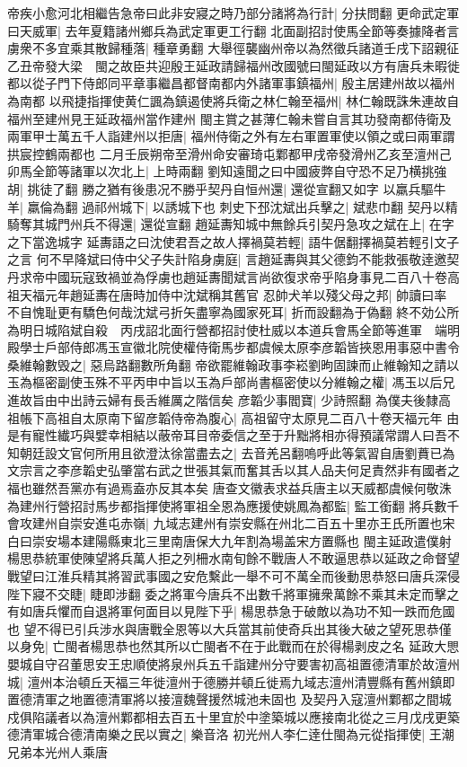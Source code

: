 帝疾小愈河北相繼告急帝曰此非安寢之時乃部分諸將為行計|{
	分扶問翻}
更命武定軍曰天威軍|{
	去年夏籍諸州鄉兵為武定軍更工行翻}
北面副招討使馬全節等奏據降者言虜衆不多宜乘其散歸種落|{
	種章勇翻}
大舉徑襲幽州帝以為然徵兵諸道壬戌下詔親征乙丑帝發大梁　閩之故臣共迎殷王延政請歸福州改國號曰閩延政以方有唐兵未暇徙都以從子門下侍郎同平章事繼昌都督南都内外諸軍事鎮福州|{
	殷主居建州故以福州為南都}
以飛捷指揮使黄仁諷為鎮遏使將兵衛之林仁翰至福州|{
	林仁翰既誅朱連故自福州至建州見王延政福州當作建州}
閩主賞之甚薄仁翰未嘗自言其功發南都侍衛及兩軍甲士萬五千人詣建州以拒唐|{
	福州侍衛之外有左右軍置軍使以領之或曰兩軍謂拱宸控鶴兩都也}
二月壬辰朔帝至滑州命安審琦屯鄴都甲戌帝發滑州乙亥至澶州己卯馬全節等諸軍以次北上|{
	上時兩翻}
劉知遠聞之曰中國疲弊自守恐不足乃横挑強胡|{
	挑徒了翻}
勝之猶有後患况不勝乎契丹自恒州還|{
	還從宣翻又如字}
以羸兵驅牛羊|{
	羸倫為翻}
過祁州城下|{
	以誘城下也}
刺史下邳沈斌出兵擊之|{
	斌悲巾翻}
契丹以精騎奪其城門州兵不得還|{
	還從宣翻}
趙延夀知城中無餘兵引契丹急攻之斌在上|{
	在字之下當逸城字}
延夀語之曰沈使君吾之故人擇禍莫若輕|{
	語牛倨翻擇禍莫若輕引文子之言}
何不早降斌曰侍中父子失計陷身虜庭|{
	言趙延夀與其父德鈞不能救張敬逹邀契丹求帝中國玩寇致禍並為俘虜也趙延夀聞斌言尚欲復求帝乎陷身事見二百八十卷高祖天福元年趙延夀在唐時加侍中沈斌稱其舊官}
忍帥犬羊以殘父母之邦|{
	帥讀曰率}
不自愧耻更有驕色何哉沈斌弓折矢盡寧為國家死耳|{
	折而設翻為于偽翻}
終不効公所為明日城陷斌自殺　丙戌詔北面行營都招討使杜威以本道兵會馬全節等進軍　端明殿學士戶部侍郎馮玉宣徽北院使權侍衛馬步都虞候太原李彦韜皆挾恩用事惡中書令桑維翰數毁之|{
	惡烏路翻數所角翻}
帝欲罷維翰政事李崧劉昫固諫而止維翰知之請以玉為樞密副使玉殊不平丙申中旨以玉為戶部尚書樞密使以分維翰之權|{
	馮玉以后兄進故旨由中出詩云婦有長舌維厲之階信矣}
彦韜少事閻寶|{
	少詩照翻}
為僕夫後隸高祖帳下高祖自太原南下留彦韜侍帝為腹心|{
	高祖留守太原見二百八十卷天福元年}
由是有寵性纎巧與嬖幸相結以蔽帝耳目帝委信之至于升黜將相亦得預議常謂人曰吾不知朝廷設文官何所用且欲澄汰徐當盡去之|{
	去音羌呂翻嗚呼此等氣習自唐劉蕡已為文宗言之李彦韜史弘肇當右武之世張其氣而奮其舌以其人品夫何足責然非有國者之福也雖然吾黨亦有過焉盍亦反其本矣}
唐查文徽表求益兵唐主以天威都虞候何敬洙為建州行營招討馬步都指揮使將軍祖全恩為應援使姚鳳為都監|{
	監工銜翻}
將兵數千會攻建州自崇安進屯赤嶺|{
	九域志建州有崇安縣在州北二百五十里亦王氏所置也宋白曰崇安場本建陽縣東北三里南唐保大九年割為場盖宋方置縣也}
閩主延政遣僕射楊思恭統軍使陳望將兵萬人拒之列柵水南旬餘不戰唐人不敢逼思恭以延政之命督望戰望曰江淮兵精其將習武事國之安危繫此一舉不可不萬全而後動思恭怒曰唐兵深侵陛下寢不交睫|{
	睫即涉翻}
委之將軍今唐兵不出數千將軍擁衆萬餘不乘其未定而擊之有如唐兵懼而自退將軍何面目以見陛下乎|{
	楊思恭急于破敵以為功不知一跌而危國也}
望不得已引兵涉水與唐戰全恩等以大兵當其前使奇兵出其後大破之望死思恭僅以身免|{
	亡閩者楊思恭也然其所以亡閩者不在于此戰而在於得楊剥皮之名}
延政大愳嬰城自守召董思安王忠順使將泉州兵五千詣建州分守要害初高祖置德清軍於故澶州城|{
	澶州本治頓丘天福三年徙澶州于德勝并頓丘徙焉九域志澶州清豐縣有舊州鎮即置德清軍之地置德清軍將以接澶魏聲援然城池未固也}
及契丹入寇澶州鄴都之間城戍俱陷議者以為澶州鄴都相去百五十里宜於中塗築城以應接南北從之三月戊戌更築德清軍城合德清南樂之民以實之|{
	樂音洛}
初光州人李仁逹仕閩為元從指揮使|{
	王潮兄弟本光州人乘唐}


